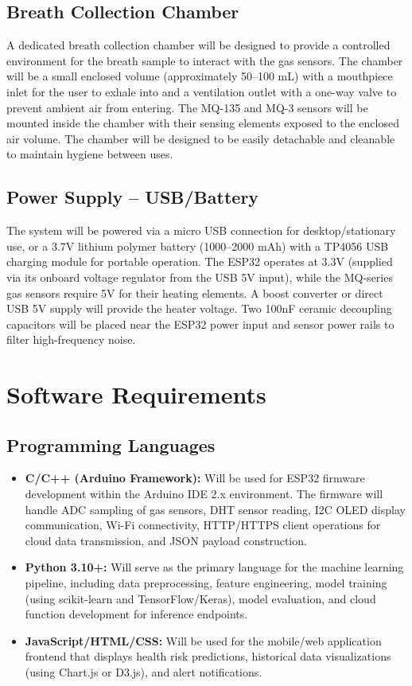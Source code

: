 \subsection{Breath Collection Chamber}
A dedicated breath collection chamber will be designed to provide a controlled environment for the breath sample to interact with the gas sensors. The chamber will be a small enclosed volume (approximately 50--100 mL) with a mouthpiece inlet for the user to exhale into and a ventilation outlet with a one-way valve to prevent ambient air from entering. The MQ-135 and MQ-3 sensors will be mounted inside the chamber with their sensing elements exposed to the enclosed air volume. The chamber will be designed to be easily detachable and cleanable to maintain hygiene between uses.

\subsection{Power Supply -- USB/Battery}
The system will be powered via a micro USB connection for desktop/stationary use, or a 3.7V lithium polymer battery (1000--2000 mAh) with a TP4056 USB charging module for portable operation. The ESP32 operates at 3.3V (supplied via its onboard voltage regulator from the USB 5V input), while the MQ-series gas sensors require 5V for their heating elements. A boost converter or direct USB 5V supply will provide the heater voltage. Two 100nF ceramic decoupling capacitors will be placed near the ESP32 power input and sensor power rails to filter high-frequency noise.

\section{Software Requirements}

\subsection{Programming Languages}
\begin{itemize}[leftmargin=1.5cm]
\item \textbf{C/C++ (Arduino Framework):} Will be used for ESP32 firmware development within the Arduino IDE 2.x environment. The firmware will handle ADC sampling of gas sensors, DHT sensor reading, I2C OLED display communication, Wi-Fi connectivity, HTTP/HTTPS client operations for cloud data transmission, and JSON payload construction.

\item \textbf{Python 3.10+:} Will serve as the primary language for the machine learning pipeline, including data preprocessing, feature engineering, model training (using scikit-learn and TensorFlow/Keras), model evaluation, and cloud function development for inference endpoints.

\item \textbf{JavaScript/HTML/CSS:} Will be used for the mobile/web application frontend that displays health risk predictions, historical data visualizations (using Chart.js or D3.js), and alert notifications.
\end{itemize}

